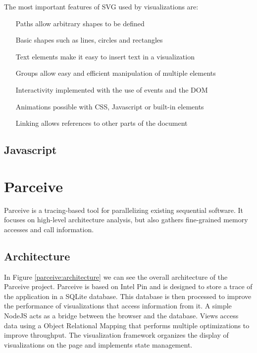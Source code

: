 The most important features of SVG used by visualizations are:

\begin{itemize}
	\item[Paths] allow arbitrary shapes to be defined
	\item[Basic shapes] such as lines, circles and rectangles
	\item[Text elements] make it easy to insert text in a visualization
	\item[Groups] allow easy and efficient manipulation of multiple elements
	\item[Interactivity] implemented with the use of events and the DOM
	\item[Animations] possible with CSS, Javascript or built-in elements
	\item[Linking] allows references to other parts of the document
\end{itemize}

\subsection {Javascript}

\section{Parceive}

Parceive \cite{parceive} is a tracing-based tool for parallelizing existing sequential software. It focuses on high-level architecture analysis, but also gathers fine-grained memory accesses and call information.

\subsection{Architecture}

In Figure \ref{parceive:architecture} we can see the overall architecture of the Parceive project. Parceive is based on Intel Pin and is designed to store a trace of the application in a SQLite database. This database is then processed to improve the performance of visualizations that access information from it. A simple NodeJS acts as a bridge between the browser and the database. Views access data using a Object Relational Mapping that performs multiple optimizations to improve throughput. The visualization framework organizes the display of visualizations on the page and implements state management.

